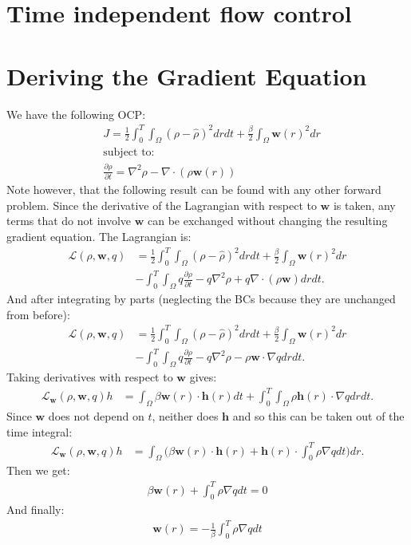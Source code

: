 \documentclass[11pt, a4paper]{article}
\theoremstyle{definition}
\newcommand{\w}{\mathbf{w}}
\newcommand{\h}{\mathbf{h}}
\begin{document}
	\section*{Time independent flow control}
	\section{Deriving the Gradient Equation}
	We have the following OCP:
	\begin{align*}
		&J = \frac{1}{2}\int_0^T \int_\Omega (\rho - \widehat \rho)^2 dr dt + \frac{\beta}{2} \int_\Omega \w(r)^2 dr\\
		&\text{subject to:}\\
		&\frac{\partial \rho}{\partial t} = \nabla^2 \rho - \nabla \cdot (\rho \w(r))
	\end{align*}
Note however, that the following result can be found with any other forward problem. Since the derivative of the Lagrangian with respect to $\w$ is taken, any terms that do not involve $\w$ can be exchanged without changing the resulting gradient equation.
	The Lagrangian is:
	\begin{align*}
		\mathcal{L}(\rho,\w, q) &=  \frac{1}{2}\int_0^T \int_\Omega (\rho - \widehat \rho)^2 dr dt + \frac{\beta}{2} \int_\Omega \w(r)^2 dr \\
		&- \int_0^T \int_\Omega q\frac{\partial \rho}{\partial t} - q\nabla^2 \rho + q\nabla \cdot (\rho \w) dr dt.
	\end{align*}
	And after integrating by parts (neglecting the BCs because they are unchanged from before):
	\begin{align*}
		\mathcal{L}(\rho,\w, q) &=  \frac{1}{2}\int_0^T \int_\Omega (\rho - \widehat \rho)^2 dr dt + \frac{\beta}{2} \int_\Omega \w(r)^2 dr \\
		&- \int_0^T \int_\Omega q\frac{\partial \rho}{\partial t} - q\nabla^2 \rho -  \rho \w \cdot \nabla q dr dt.
	\end{align*}
	Taking derivatives with respect to $\w$ gives:
	\begin{align*}
		\mathcal{L}_\w(\rho,\w, q)h &= \int_\Omega \beta \w(r) \cdot \h(r) dt + \int_0^T \int_\Omega \rho \h(r) \cdot \nabla q dr dt.
	\end{align*}
	Since $\w$ does not depend on $t$, neither does $\h$ and so this can be taken out of the time integral:
	\begin{align*}
		\mathcal{L}_\w(\rho,\w, q)h &= \int_\Omega \bigg( \beta \w(r) \cdot \h(r)  + \h(r) \cdot \int_0^T \rho  \nabla q dt \bigg) dr.
	\end{align*}
	Then we get:
	\begin{align*}
		\beta \w(r)  +  \int_0^T \rho  \nabla q dt = 0
	\end{align*}
	And finally:
	\begin{align*}
		\w(r) = - \frac{1}{\beta} \int_0^T \rho  \nabla q dt
	\end{align*}
\end{document}
